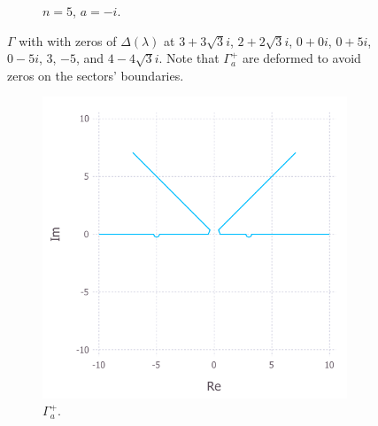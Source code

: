 \documentclass[12pt, oneside, a4paper]{article}
\begin{document}
\begin{figure}[htpb!]
\begin{subfigure}{.5\textwidth}
        \caption{$n=5$, $a=-i$.}
    \end{subfigure}
    \caption{$\Gamma$ with with zeros of $\Delta(\lambda)$ at $3+3\sqrt{3}i$, $2+2\sqrt{3}i$, $0+0i$, $0+5i$, $0-5i$, $3$, $-5$, and $4-4\sqrt{3}i$. Note that $\Gamma_a^+$ are deformed to avoid zeros on the sectors' boundaries.}
    \label{fig:contourPlots}
\end{figure}

\begin{figure}[htpb!]
    \begin{subfigure}{.5\textwidth}
      \centering
      \includegraphics[width=1\linewidth]{contourPlot_n=2_a=1_gammaAPlus_cropped.pdf}
      \caption{$\Gamma_a^+$.}
    \end{subfigure}%
    \begin{subfigure}{.5\textwidth}
      \centering

\end{subfigure}
\end{figure}
\end{document}
